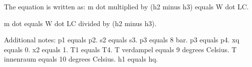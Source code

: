 The equation is written as:  
m dot multiplied by (h2 minus h3) equals W dot LC.  

m dot equals W dot LC divided by (h2 minus h3).  

Additional notes:  
p1 equals p2.  
s2 equals s3.  
p3 equals 8 bar.  
p3 equals p4.  
xq equals 0.  
x2 equals 1.  
T1 equals T4.  
T verdampel equals 9 degrees Celsius.  
T innenraum equals 10 degrees Celsius.  
h1 equals hq.